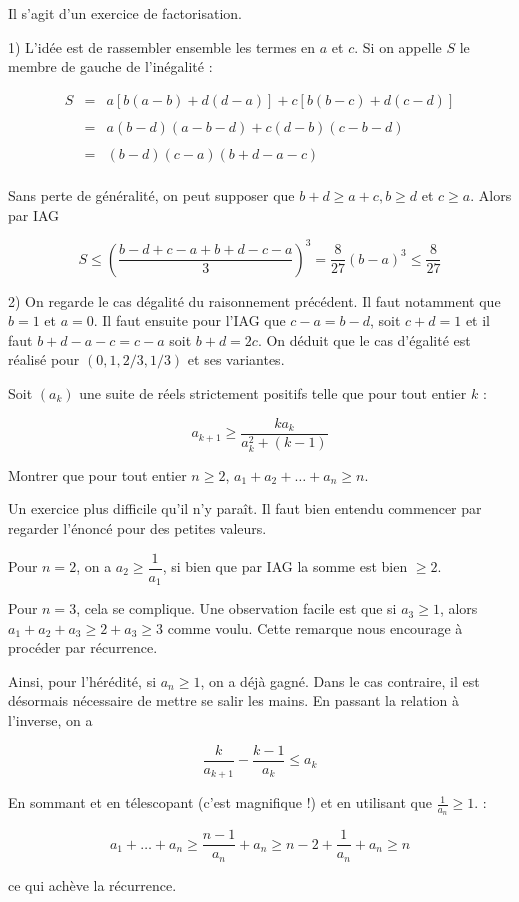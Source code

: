 \begin{sol}
Il s'agit d'un exercice de factorisation.

1) L'idée est de rassembler ensemble les termes en $a$ et $c$. Si on appelle $S$ le membre de gauche de l'inégalité :

$$\begin{array}{lll}
S &=& a[b(a-b)+d(d-a)] + c[b(b-c)+d(c-d)]\\
&&\\
&=& a(b-d)(a-b-d) + c(d-b)(c-b-d)\\
&&\\
&=& (b-d)(c-a)(b+d-a-c)\\
\end{array}$$

Sans perte de généralité, on peut supposer que $b+d\ge a+c, b\ge d$ et $c\ge a$. Alors par IAG

$$S\le \left(\frac{b-d+c-a+b+d-c-a}{3}\right)^3 = \frac{8}{27}(b-a)^3\le \frac{8}{27}$$

2) On regarde le cas dégalité du raisonnement précédent. Il faut notamment que $b=1$ et $a=0$. Il faut ensuite pour l'IAG que $c-a=b-d$, soit $c+d=1$ et il faut $b+d-a-c= c-a$ soit $b+d=2c$. On déduit que le cas d'égalité est réalisé pour $(0,1,2/3,1/3)$ et ses variantes.
\end{sol}





\begin{exo}[IMO SL 2015 A1]
Soit $(a_k)$ une suite de réels strictement positifs telle que pour tout entier $k$ :

$$a_{k+1} \ge \frac{ka_k}{a_k^2 +(k-1)}$$

Montrer que pour tout entier $n\ge 2$, $a_1+a_2+\ldots +a_n \ge n$.
\end{exo}

\begin{sol}
Un exercice plus difficile qu'il n'y paraît. Il faut bien entendu commencer par regarder l'énoncé pour des petites valeurs.

Pour $n=2$, on a $a_2\ge \dfrac1{a_1}$, si bien que par IAG la somme est bien $\ge 2$.

Pour $n=3$, cela se complique. Une observation facile est que si $a_3\ge 1$, alors $a_1+a_2+a_3\ge 2+a_3 \ge 3$ comme voulu. Cette remarque nous encourage à procéder par récurrence.

Ainsi, pour l'hérédité, si $a_n\ge 1$, on a déjà gagné. Dans le cas contraire, il est désormais nécessaire de mettre se salir les mains. En passant la relation à l'inverse, on a

$$\frac{k}{a_{k+1}}- \frac{k-1}{a_k} \le a_k$$

En sommant et en télescopant (c'est magnifique !) et en utilisant que $\frac1{a_n}\ge 1$. :

$$a_1+ \ldots + a_n \ge \frac{n-1}{a_n} + a_n \ge n-2 + \frac1{a_n}+a_n \ge n$$

ce qui achève la récurrence.
\end{sol}